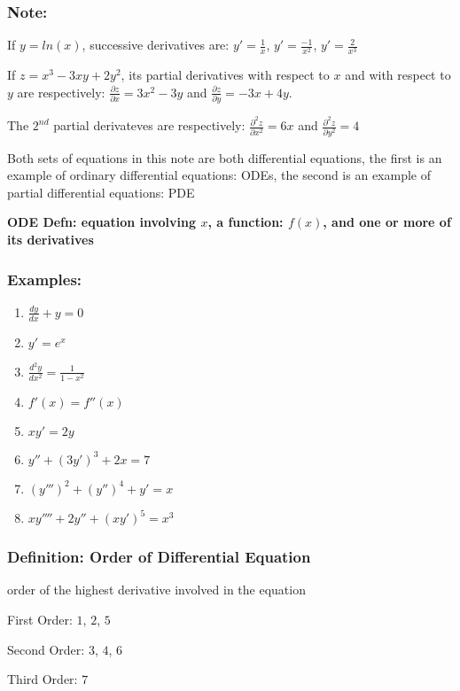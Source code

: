 \documentclass{article}
\theoremstyle{definition}
\theoremstyle{remark}
\begin{document}
\subsubsection{Note:}

If $y = ln(x)$, successive derivatives are:
$y'=\frac{1}{x}$, $y'=\frac{-1}{x^2}$, $y'=\frac{2}{x^3}$

If $z= x^3 -3xy+2y^2$, its partial derivatives with respect to $x$ and with respect to $y$ are respectively: $\frac{\partial z}{\partial x} = 3x^2 - 3y$ and $\frac{\partial z}{\partial y} = -3x+4y$.

The $2^{nd}$ partial derivateves are respectively: $\frac{\partial^2 z}{\partial x^2} = 6x$ and $\frac{\partial^2 z}{\partial y^2} = 4$

Both sets of equations in this note are both differential equations, the first is an example of ordinary differential equations: ODEs, the second is an example of partial differential equations: PDE


\textbf{ODE Defn: equation involving $x$, a function: $f(x)$, and one or more of its derivatives}

\subsubsection{Examples:}

\begin{enumerate}
\item $\frac{dy}{dx} + y = 0$
\item $y' = e^x$
\item $\frac{d^2 y}{d x^2} = \frac{1}{1-x^2}$
\item $f'(x) = f''(x)$
\item $x y' = 2y$
\item $y'' + (3y')^3 +2x = 7$
\item $(y''')^2 + (y'')^4 + y' = x$
\item $xy'''' + 2y''+(xy')^5 = x^3$
\end{enumerate}

\subsubsection{Definition: Order of Differential Equation}
order of the highest derivative involved in the equation

First Order: $1$, $2$, $5$

Second Order: $3$, $4$, $6$

Third Order: $7$
\end{document}

